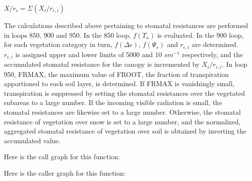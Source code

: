 $X/r_c = \Sigma (X_i / r_{c,i})$

The calculations described above pertaining to stomatal resistances are performed in loops 850, 900 and 950. In the 850 loop, $f(T_a)$ is evaluated. In the 900 loop, for each vegetation category in turn, $f(\Delta e)$, $f(\Psi_s)$ and $r_{c,i}$ are determined. $r_{c,i}$ is assigned upper and lower limits of 5000 and 10 $s m^{-1}$ respectively, and the accumulated stomatal resistance for the canopy is incremented by $X_i / r_{c,i}$. In loop 950, F\+R\+M\+A\+X, the maximum value of F\+R\+O\+O\+T, the fraction of transpiration apportioned to each soil layer, is determined. If F\+R\+M\+A\+X is vanishingly small, transpiration is suppressed by setting the stomatal resistances over the vegetated subareas to a large number. If the incoming visible radiation is small, the stomatal resistances are likewise set to a large number. Otherwise, the stomatal resistance of vegetation over snow is set to a large number, and the normalized, aggregated stomatal resistance of vegetation over soil is obtained by inverting the accumulated value.

Here is the call graph for this function\+:




Here is the caller graph for this function\+:


